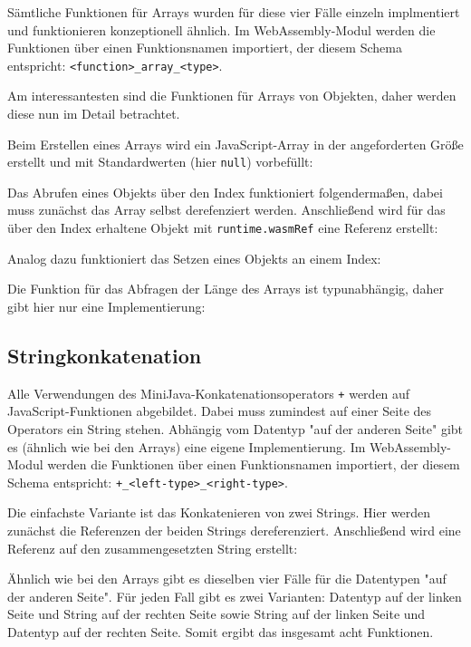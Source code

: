 Sämtliche Funktionen für Arrays wurden für diese vier Fälle einzeln implmentiert und funktionieren konzeptionell ähnlich. Im WebAssembly-Modul werden die Funktionen über einen Funktionsnamen importiert, der diesem Schema entspricht: \lstinline{<function>_array_<type>}.

Am interessantesten sind die Funktionen für Arrays von Objekten, daher werden diese nun im Detail betrachtet.

Beim Erstellen eines Arrays wird ein JavaScript-Array in der angeforderten Größe erstellt und mit Standardwerten (hier \lstinline{null}) vorbefüllt:


Das Abrufen eines Objekts über den Index funktioniert folgendermaßen, dabei muss zunächst das Array selbst derefenziert werden. Anschließend wird für das über den Index erhaltene Objekt mit \lstinline{runtime.wasmRef} eine Referenz erstellt:


Analog dazu funktioniert das Setzen eines Objekts an einem Index:


Die Funktion für das Abfragen der Länge des Arrays ist typunabhängig, daher gibt hier nur eine Implementierung:



\subsection{Stringkonkatenation}

Alle Verwendungen des MiniJava-Konkatenationsoperators \lstinline{+} werden auf JavaScript-Funktionen abgebildet. Dabei muss zumindest auf einer Seite des Operators ein String stehen. Abhängig vom Datentyp "auf der anderen Seite" gibt es (ähnlich wie bei den Arrays) eine eigene Implementierung. Im WebAssembly-Modul werden die Funktionen über einen Funktionsnamen importiert, der diesem Schema entspricht: \lstinline{+_<left-type>_<right-type>}.

Die einfachste Variante ist das Konkatenieren von zwei Strings. Hier werden zunächst die Referenzen der beiden Strings dereferenziert. Anschließend wird eine Referenz auf den zusammengesetzten String erstellt:


Ähnlich wie bei den Arrays gibt es dieselben vier Fälle für die Datentypen "auf der anderen Seite". Für jeden Fall gibt es zwei Varianten: Datentyp auf der linken Seite und String auf der rechten Seite sowie String auf der linken Seite und Datentyp auf der rechten Seite. Somit ergibt das insgesamt acht Funktionen.

